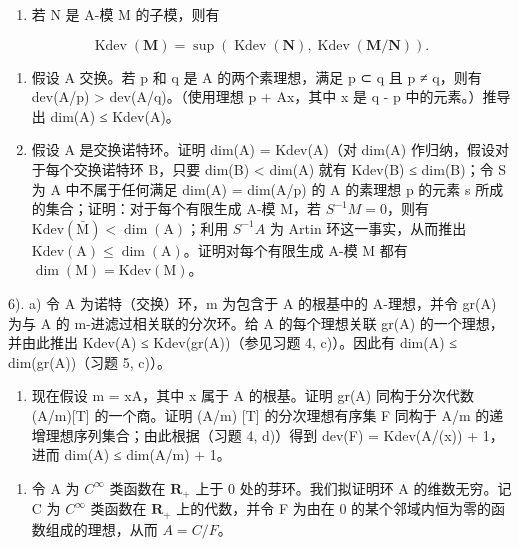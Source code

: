\begin{enumerate}
\def\labelenumi{\alph{enumi})}
\tightlist
\item
  若 N 是 A-模 M 的子模，则有
\end{enumerate}

\[
\operatorname{Kdev} (\mathbf {M}) = \sup (\operatorname{Kdev} (\mathbf {N}), \operatorname{Kdev} (\mathbf {M} / \mathbf {N}))  .
\]

\begin{enumerate}
\def\labelenumi{\alph{enumi})}
\setcounter{enumi}{1}
\item
  假设 A 交换。若 p 和 q 是 A 的两个素理想，满足 p ⊂ q 且 p ≠ q，则有 dev(A/p) \textgreater{} dev(A/q)。（使用理想 p + Ax，其中 x 是 q - p 中的元素。）推导出 dim(A) ≤ Kdev(A)。
\item
   假设 A 是交换诺特环。证明 dim(A) = Kdev(A)（对 dim(A) 作归纳，假设对于每个交换诺特环 B，只要 dim(B) \textless{} dim(A) 就有 Kdev(B) ≤ dim(B)；令 S 为 A 中不属于任何满足 dim(A) = dim(A/p) 的 A 的素理想 p 的元素 s 所成的集合；证明：对于每个有限生成 A-模 M，若 \(S^{-1}M = 0\)，则有 \(\mathrm{Kdev}(\bar{\mathrm{M}}) < \dim(\mathrm{A})\)；利用 \(S^{-1}A\) 为 Artin 环这一事实，从而推出 \(\mathrm{Kdev}(\mathrm{A}) \leqslant \dim(\mathrm{A})\)。证明对每个有限生成 A-模 M 都有 \(\dim(\mathrm{M}) = \mathrm{Kdev}(\mathrm{M})\)。
\end{enumerate}

6). a) 令 A 为诺特（交换）环，m 为包含于 A 的根基中的 A-理想，并令 gr(A) 为与 A 的 m-进滤过相关联的分次环。给 A 的每个理想关联 gr(A) 的一个理想，并由此推出 Kdev(A) ≤ Kdev(gr(A))（参见习题 4, c)）。因此有 dim(A) ≤ dim(gr(A))（习题 5, c)）。

\begin{enumerate}
\def\labelenumi{\alph{enumi})}
\setcounter{enumi}{1}
\tightlist
\item
  现在假设 m = xA，其中 x 属于 A 的根基。证明 gr(A) 同构于分次代数 (A/m)[T] 的一个商。证明 (A/m) {[}T{]} 的分次理想有序集 F 同构于 A/m 的递增理想序列集合；由此根据（习题 4, d)）得到 dev(F) = Kdev(A/(x)) + 1，进而 dim(A) ≤ dim(A/m) + 1。
\end{enumerate}

\begin{enumerate}
\def\labelenumi{\arabic{enumi})}
\setcounter{enumi}{6}
\tightlist
\item
  令 A 为 \(C^\infty\) 类函数在 \(\mathbf{R}_{+}\) 上于 0 处的芽环。我们拟证明环 A 的维数无穷。记 C 为 \(C^\infty\) 类函数在 \(\mathbf{R}_{+}\) 上的代数，并令 F 为由在 0 的某个邻域内恒为零的函数组成的理想，从而 \(A = C / F\)。
\end{enumerate}

